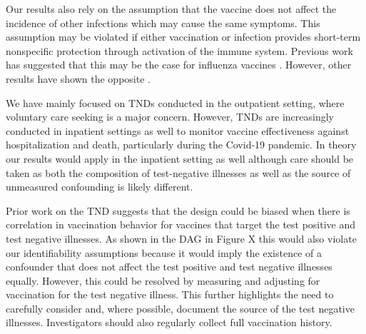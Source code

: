 \documentclass[11pt]{article}
\begin{document}
Our results also rely on the assumption that the vaccine does not affect the incidence of other infections which may cause the same symptoms. This assumption may be violated if either vaccination or infection provides short-term nonspecific protection through activation of the immune system. Previous work has suggested that this may be the case for influenza vaccines \cite{cowling_increased_2012}. However, other results have shown the opposite \cite{sundaram_influenza_2013}.

We have mainly focused on TNDs conducted in the outpatient setting, where voluntary care seeking is a major concern. However, TNDs are increasingly conducted in inpatient settings as well to monitor vaccine effectiveness against hospitalization and death, particularly during the Covid-19 pandemic. In theory our results would apply in the inpatient setting as well although care should be taken as both the composition of test-negative illnesses as well as the source of unmeasured confounding is likely different. 


Prior work on the TND suggests that the design could be biased when there is correlation in vaccination behavior for vaccines that target the test positive and test negative illnesses. As shown in the DAG in Figure X this would also violate our identifiability assumptions because it would imply the existence of a confounder that does not affect the test positive and test negative illnesses equally. However, this could be resolved by measuring and adjusting for vaccination for the test negative illness. This further highlights the need to carefully consider and, where possible, document the source of the test negative illnesses. Investigators should also regularly collect full vaccination history.

\newpage

\printbibliography
\end{document}
